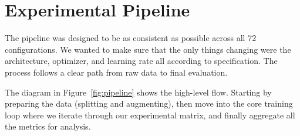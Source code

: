 \section{Experimental Pipeline}
\label{sec:pipeline}

The pipeline was designed to be as consistent as possible across all 72 configurations. We wanted to make sure that the only things changing were the architecture, optimizer, and learning rate all according to specification. The process follows a clear path from raw data to final evaluation.

The diagram in Figure~\ref{fig:pipeline} shows the high-level flow. Starting by preparing the data (splitting and augmenting), then move into the core training loop where we iterate through our experimental matrix, and finally aggregate all the metrics for analysis.






